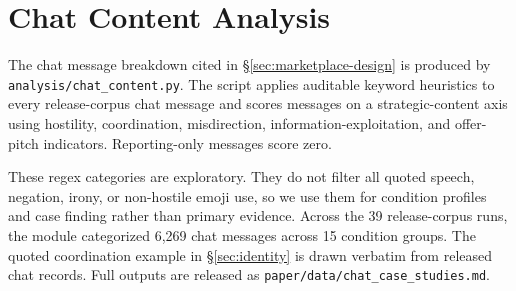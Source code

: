 \documentclass{article}
\begin{document}
\section{Chat Content Analysis}
\label{app:chat}

The chat message breakdown cited in \S\ref{sec:marketplace-design} is produced by \texttt{analysis/chat\_content.py}.
The script applies auditable keyword heuristics to every release-corpus chat message and scores messages on a strategic-content axis using hostility, coordination, misdirection, information-exploitation, and offer-pitch indicators.
Reporting-only messages score zero.

These regex categories are exploratory.
They do not filter all quoted speech, negation, irony, or non-hostile emoji use, so we use them for condition profiles and case finding rather than primary evidence.
Across the 39 release-corpus runs, the module categorized 6{,}269 chat messages across 15 condition groups.
The quoted coordination example in \S\ref{sec:identity} is drawn verbatim from released chat records.
Full outputs are released as \texttt{paper/data/chat\_case\_studies.md}.
\end{document}
